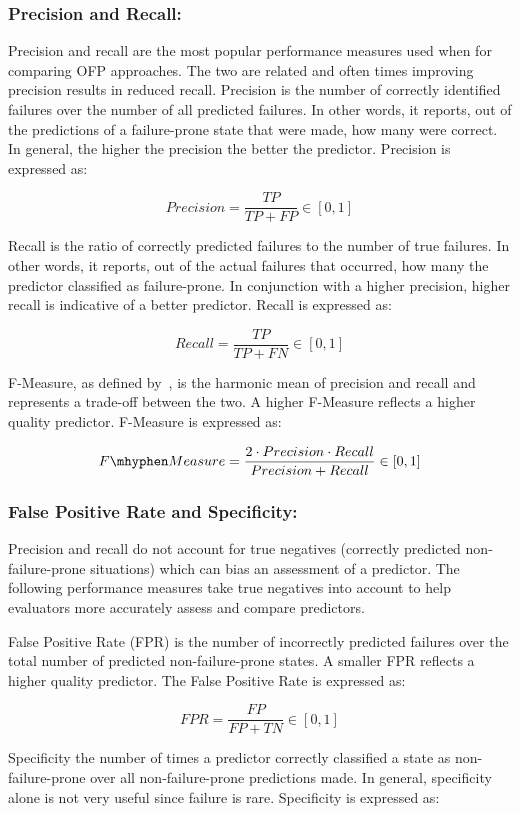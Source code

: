 \subsubsection{Precision and Recall:}
Precision and recall are the most popular performance measures used when
for comparing OFP approaches.  The two are related and often times
improving precision results in reduced recall.  Precision is the number of
correctly identified failures over the number of all predicted failures.  In
other words, it reports, out of the predictions of a failure-prone state that
were made, how many were correct.  In general, the higher the precision the
better the predictor.  Precision is expressed as:

\[ Precision 
	= \dfrac{TP}{TP + FP} \in [0,1]
\]

Recall is the ratio of correctly predicted failures to the number of true
failures.  In other words, it reports, out of the actual failures that
occurred, how many the predictor classified as failure-prone.  In conjunction
with a higher precision, higher recall is indicative of a better predictor.
Recall is expressed as:

\[ Recall 
	= \dfrac{TP}{TP + FN} \in [0,1]
\]

F-Measure, as defined by~\cite{rijsbergen1979v}, is the harmonic mean of
precision and recall and represents a trade-off between the two.  A higher
F-Measure reflects a higher quality predictor.  F-Measure is expressed as:

\[ F\mhyphen Measure 
	= \dfrac{2 \cdot Precision \cdot Recall}{Precision + Recall} \in [0,1]
\]

\subsubsection{False Positive Rate and Specificity:}
Precision and recall do not account for true negatives (correctly predicted
non-failure-prone situations) which can bias an assessment of a predictor.  The
following performance measures take true negatives into account to help
evaluators more accurately assess and compare predictors.

False Positive Rate (FPR) is the number of incorrectly predicted failures over
the total number of predicted non-failure-prone states.  A smaller FPR reflects
a higher quality predictor.  The False Positive Rate is expressed as:

\[ \mathit{FPR}
	= \dfrac{FP}{FP + TN} \in [0,1]
\]

Specificity the number of times a predictor correctly classified a state as
non-failure-prone over all non-failure-prone predictions made.  In general,
specificity alone is not very useful since failure is rare.  Specificity is
expressed as:

